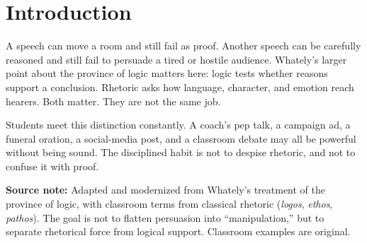 \documentclass[12pt]{article}
\newcommand{\focusbox}[1]{\par\vspace{0.4em}\noindent\begingroup\setlength{\fboxsep}{6pt}\colorbox{gray!12}{\begin{minipage}{\dimexpr\linewidth-2\fboxsep\relax}#1\end{minipage}}\endgroup\par\vspace{0.5em}}
\begin{document}
\section*{Introduction}
A speech can move a room and still fail as proof. Another speech can be carefully reasoned and still fail to persuade a tired or hostile audience. Whately's larger point about the province of logic matters here: logic tests whether reasons support a conclusion. Rhetoric asks how language, character, and emotion reach hearers. Both matter. They are not the same job.

Students meet this distinction constantly. A coach's pep talk, a campaign ad, a funeral oration, a social-media post, and a classroom debate may all be powerful without being sound. The disciplined habit is not to despise rhetoric, and not to confuse it with proof.

\focusbox{\textbf{Source note:} Adapted and modernized from Whately's treatment of the province of logic, with classroom terms from classical rhetoric (\textit{logos}, \textit{ethos}, \textit{pathos}). The goal is not to flatten persuasion into ``manipulation,'' but to separate rhetorical force from logical support. Classroom examples are original.}
\end{document}
